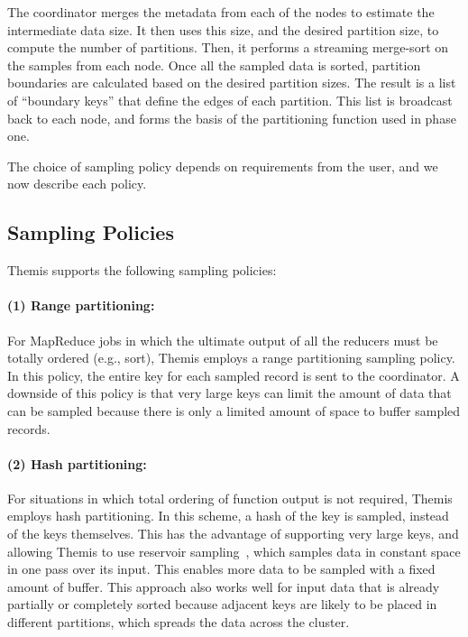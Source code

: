 The coordinator merges the metadata from each of the nodes to estimate the
intermediate data size.  It then uses this size, and the desired partition
size, to compute the number of partitions.  Then, it performs a streaming
merge-sort on the samples from each node.  Once all the sampled data is sorted,
partition boundaries are calculated based on the desired partition sizes.  The
result is a list of ``boundary keys'' that define the edges of each partition.
This list is broadcast back to each node, and forms the basis of the
partitioning function used in phase one.

The choice of sampling policy depends on requirements from the user,
and we now describe each policy.

\subsection{Sampling Policies}

Themis supports the following sampling policies:

\paragraph{(1) Range partitioning:}
For MapReduce jobs in which the ultimate output of all the reducers must be
totally ordered (e.g., sort), Themis employs a range partitioning sampling
policy.  In this policy, the entire key for each sampled record is
sent to the coordinator.  A downside of this policy is that very large
keys can limit the amount of data that can be sampled because there is
only a limited amount of space to buffer sampled records.

\paragraph{(2) Hash partitioning:} For situations in which total ordering of
\reduce function output is not required, Themis employs hash partitioning.  In
this scheme, a hash of the key is sampled, instead of the keys themselves.
This has the advantage of supporting very large keys, and allowing Themis to
use reservoir sampling~\cite{Vitter:1985:RSR:3147.3165}, which samples data in
constant space in one pass over its input.  This enables more data to be
sampled with a fixed amount of buffer.  This approach also works well for input
data that is already partially or completely sorted because adjacent keys are
likely to be placed in different partitions, which spreads the data across the
cluster.
